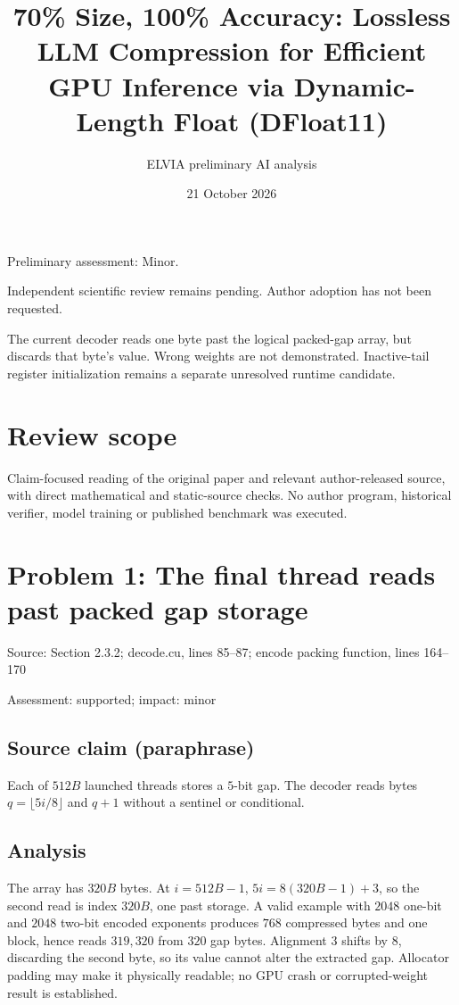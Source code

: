 \documentclass[11pt]{article}
\begin{document}
\title{70\% Size, 100\% Accuracy: Lossless LLM Compression for Efficient GPU Inference via Dynamic-Length Float (DFloat11)}

\author{ELVIA preliminary AI analysis}\date{21 October 2026}\maketitle

Preliminary assessment: Minor.\par

Independent scientific review remains pending. Author adoption has not been requested.

The current decoder reads one byte past the logical packed-gap array, but discards that byte’s value. Wrong weights are not demonstrated. Inactive-tail register initialization remains a separate unresolved runtime candidate.

\section*{Review scope}

Claim-focused reading of the original paper and relevant author-released source, with direct mathematical and static-source checks. No author program, historical verifier, model training or published benchmark was executed.

\section*{Problem 1: The final thread reads past packed gap storage}

Source: Section 2.3.2; decode.cu, lines 85–87; encode packing function, lines 164–170

Assessment: supported; impact: minor

\subsection*{Source claim (paraphrase)}

Each of \(512B\) launched threads stores a \(5\)-bit gap. The decoder reads bytes \(q=\lfloor5i/8\rfloor\) and \(q+1\) without a sentinel or conditional.

\subsection*{Analysis}

The array has \(320B\) bytes. At \(i=512B-1\), \(5i=8(320B-1)+3\), so the second read is index \(320B\), one past storage. A valid example with \(2048\) one-bit and \(2048\) two-bit encoded exponents produces \(768\) compressed bytes and one block, hence reads \(319,320\) from \(320\) gap bytes. Alignment \(3\) shifts by \(8\), discarding the second byte, so its value cannot alter the extracted gap. Allocator padding may make it physically readable; no GPU crash or corrupted-weight result is established.
\end{document}
